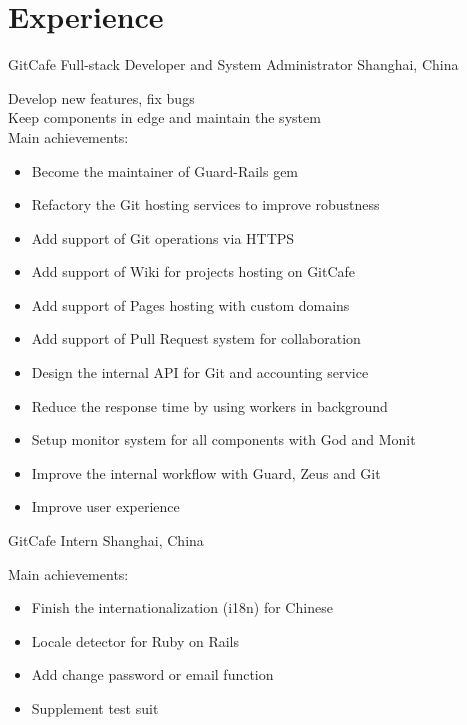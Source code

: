 \documentclass[]{friggeri-cv} %
\begin{document}

\section{Experience}

\begin{entrylist}
  {GitCafe \textnormal{Full-stack Developer and System Administrator}}
  {Shanghai, China}
  {
    Develop new features, fix bugs\\
    Keep components in edge and maintain the system\\
    Main achievements:
    \begin{itemize}
    \item Become the maintainer of Guard-Rails gem
    \item Refactory the Git hosting services to improve robustness
    \item Add support of Git operations via HTTPS
    \item Add support of Wiki for projects hosting on GitCafe
    \item Add support of Pages hosting with custom domains
    \item Add support of Pull Request system for collaboration
    \item Design the internal API for Git and accounting service
    \item Reduce the response time by using workers in background
    \item Setup monitor system for all components with God and Monit
    \item Improve the internal workflow with Guard, Zeus and Git
    \item Improve user experience
    \end{itemize}
  }
  {GitCafe \textnormal{Intern}}
  {Shanghai, China}
  {
    Main achievements:
    \begin{itemize}
    \item Finish the internationalization (i18n) for Chinese
    \item Locale detector for Ruby on Rails
    \item Add change password or email function
    \item Supplement test suit
    \end{itemize}
  }
\end{entrylist}
\end{document}
